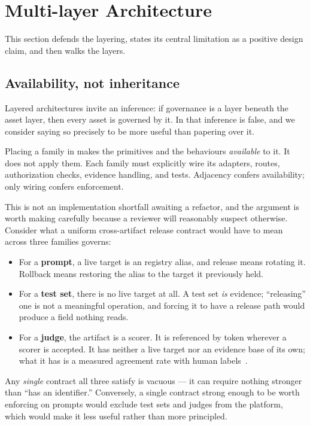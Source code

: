 \section{Multi-layer Architecture}
\label{sec:arch}

This section defends the layering, states its central limitation as a positive
design claim, and then walks the layers.

\subsection{Availability, not inheritance}
\label{sec:arch:claim}

Layered architectures invite an inference: if governance is a layer beneath the
asset layer, then every asset is governed by it. In \sys that inference is false,
and we consider saying so precisely to be more useful than papering over it.

Placing a family in \Lfam{} makes the \Lgov{} primitives and the \Lmode{}
behaviours \emph{available} to it. It does not apply them. Each family must
explicitly wire its adapters, routes, authorization checks, evidence handling, and
tests. Adjacency confers availability; only wiring confers enforcement.

This is not an implementation shortfall awaiting a refactor, and the argument is
worth making carefully because a reviewer will reasonably suspect otherwise.
Consider what a uniform cross-artifact release contract would have to mean across
three families \sys governs:

\begin{itemize}
\item For a \textbf{prompt}, a live target is an \mlflow{} registry alias, and
      release means rotating it. Rollback means restoring the alias to the target
      it previously held.
\item For a \textbf{test set}, there is no live target at all. A test set
      \emph{is} evidence; ``releasing'' one is not a meaningful operation, and
      forcing it to have a release path would produce a field nothing reads.
\item For a \textbf{judge}, the artifact is a scorer. It is referenced by token
      wherever a scorer is accepted. It has neither a live target nor an evidence
      base of its own; what it has is a measured agreement rate with human
      labels~\cite{cohen1960kappa}.
\end{itemize}

Any \emph{single} contract all three satisfy is vacuous --- it can require nothing
stronger than ``has an identifier.'' Conversely, a single contract strong enough to
be worth enforcing on prompts would exclude test sets and judges from the platform,
which would make it less useful rather than more principled.


